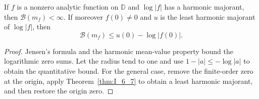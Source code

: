 \begin{theorem}
  \label{thm:II_2_1}
  \leanok
  \mainline
  If $f$ is a nonzero analytic function on $\mathbb D$ and $\log|f|$
  has a harmonic majorant, then $\mathcal B(m_f)<\infty$.
  If moreover $f(0)\ne0$ and $u$ is the least harmonic majorant of
  $\log|f|$, then
  \[
    \mathcal B(m_f)\le u(0)-\log|f(0)|.
  \]
  \begin{proof}
    \leanok
    Jensen's formula and the harmonic mean-value property bound the
    logarithmic zero sums. Let the radius tend to one and use
    $1-|a|\le-\log|a|$ to obtain the quantitative bound.
    For the general case, remove the finite-order zero at the origin,
    apply Theorem~\ref{thm:I_6_7} to obtain a least harmonic majorant,
    and then restore the origin zero.
  \end{proof}
\end{theorem}

